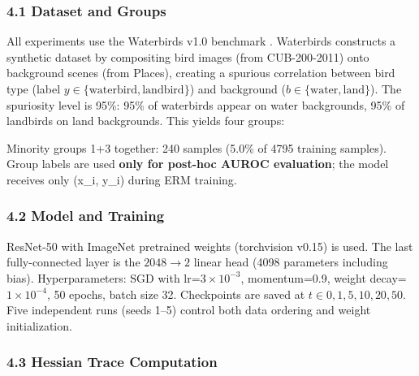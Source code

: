
\subsubsection{4.1 Dataset and Groups}

All experiments use the Waterbirds v1.0 benchmark \citep{sagawa2019distributionally}. Waterbirds constructs a synthetic dataset by compositing bird images (from CUB-200-2011) onto background scenes (from Places), creating a spurious correlation between bird type (label $y\in \{\text{waterbird}, \text{landbird}\}$) and background ($b\in \{\text{water}, \text{land}\}$). The spuriosity level is 95\%: 95\% of waterbirds appear on water backgrounds, 95\% of landbirds on land backgrounds. This yields four groups:

\begin{table}[htbp]
\centering
{}
\end{table}

Minority groups 1+3 together: 240 samples (5.0\% of 4795 training samples). Group labels are used \textbf{only for post-hoc AUROC evaluation}; the model receives only (x\_i, y\_i) during ERM training.

\subsubsection{4.2 Model and Training}

ResNet-50 with ImageNet pretrained weights (torchvision v0.15) is used. The last fully-connected layer is the $2048\rightarrow 2$ linear head (4098 parameters including bias). Hyperparameters: SGD with lr=$3\times 10^{-3}$, momentum=0.9, weight decay=$1\times 10^{-4}$, 50 epochs, batch size 32. Checkpoints are saved at $t\in {0,1,5,10,20,50}$. Five independent runs (seeds 1--5) control both data ordering and weight initialization.

\subsubsection{4.3 Hessian Trace Computation}


